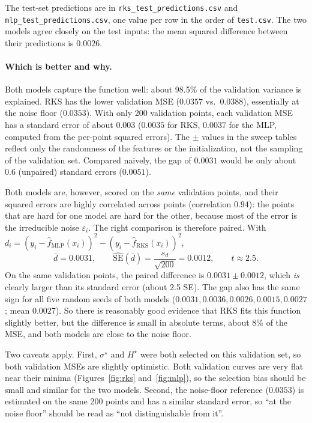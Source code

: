 \documentclass[11pt]{article}
\begin{document}
The test-set predictions are in \texttt{rks\_test\_predictions.csv} and
\texttt{mlp\_test\_predictions.csv}, one value per row in the order of \texttt{test.csv}. The two
models agree closely on the test inputs: the mean squared difference between their predictions is
$0.0026$.

\paragraph{Which is better and why.} Both models capture the function well: about 98.5\% of the
validation variance is explained. RKS has the lower validation MSE ($0.0357$ vs.\ $0.0388$),
essentially at the noise floor ($0.0353$). With only 200 validation points, each validation MSE
has a standard error of about $0.003$ ($0.0035$ for RKS, $0.0037$ for the MLP, computed from the
per-point squared errors). The $\pm$ values in the sweep tables reflect only the randomness of the
features or the initialization, not the sampling of the validation set. Compared naively, the gap
of $0.0031$ would be only about $0.6$ (unpaired) standard errors ($0.0051$).

Both models are, however, scored on the \emph{same} validation points, and their squared errors
are highly correlated across points (correlation $0.94$): the points that are hard for one model
are hard for the other, because most of the error is the irreducible noise $\varepsilon_i$. The
right comparison is therefore paired. With $d_i=(y_i-\hat f_{\text{MLP}}(x_i))^2-(y_i-\hat
f_{\text{RKS}}(x_i))^2$,
\[
 \bar d = 0.0031,\qquad \widehat{\mathrm{SE}}(\bar d)=\frac{s_d}{\sqrt{200}}=0.0012,\qquad t\approx2.5 .
\]
On the same validation points, the paired difference is $0.0031\pm0.0012$, which \emph{is} clearly
larger than its standard error (about 2.5 SE). The gap also has the same sign for all five random
seeds of both models ($0.0031, 0.0036, 0.0026, 0.0015, 0.0027$; mean $0.0027$). So there is
reasonably good evidence that RKS fits this function slightly better, but the difference is small
in absolute terms, about $8\%$ of the MSE, and both models are close to the noise floor.

Two caveats apply. First, $\sigma^\star$ and $H^\star$ were both selected on this validation set,
so both validation MSEs are slightly optimistic. Both validation curves are very flat near their
minima (Figures~\ref{fig:rks} and~\ref{fig:mlp}), so the selection bias should be small and
similar for the two models. Second, the noise-floor reference ($0.0353$) is estimated on the same
200 points and has a similar standard error, so ``at the noise floor'' should be read as ``not
distinguishable from it''.
\end{document}
